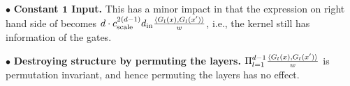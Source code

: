 $\bullet$ \textbf{Constant $\mathbf{1}$ Input.} This has a minor impact in that the expression on right hand side of  becomes $d \cdot c_{\text{scale}}^{2(d-1)}d_{\text{in}} \frac{\langle G_l(x),G_l(x')\rangle}w$, i.e., the kernel still has information of the gates.

$\bullet$ \textbf{Destroying structure by permuting the layers.}  $\Pi_{l=1}^{d-1} \frac{\langle G_l(x),G_l(x')\rangle}w$ is permutation invariant, and hence permuting the layers has no effect.





